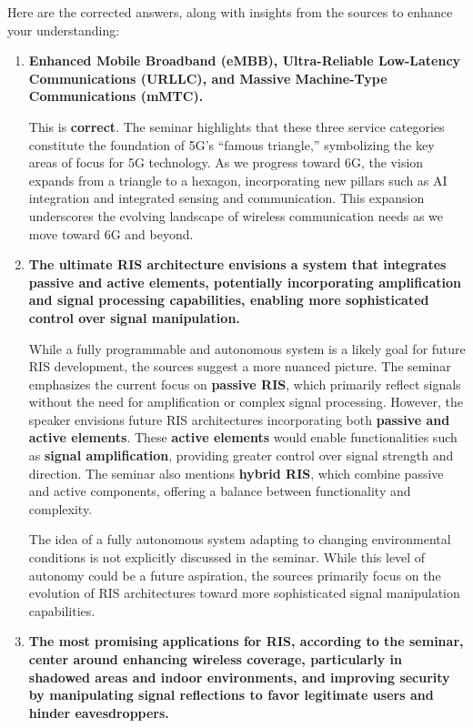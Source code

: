 \documentclass[
]{article}
\author{}
\date{}
\begin{document}
Here are the corrected answers, along with insights from the sources to
enhance your understanding:

\begin{enumerate}
\def\labelenumi{\arabic{enumi}.}
\item
  \textbf{Enhanced Mobile Broadband (eMBB), Ultra-Reliable Low-Latency
  Communications (URLLC), and Massive Machine-Type Communications
  (mMTC).}

  This is \textbf{correct}. The seminar highlights that these three
  service categories constitute the foundation of 5G's ``famous
  triangle,'' symbolizing the key areas of focus for 5G technology. As
  we progress toward 6G, the vision expands from a triangle to a
  hexagon, incorporating new pillars such as AI integration and
  integrated sensing and communication. This expansion underscores the
  evolving landscape of wireless communication needs as we move toward
  6G and beyond.
\item
  \textbf{The ultimate RIS architecture envisions a system that
  integrates passive and active elements, potentially incorporating
  amplification and signal processing capabilities, enabling more
  sophisticated control over signal manipulation.}

  While a fully programmable and autonomous system is a likely goal for
  future RIS development, the sources suggest a more nuanced picture.
  The seminar emphasizes the current focus on \textbf{passive RIS},
  which primarily reflect signals without the need for amplification or
  complex signal processing. However, the speaker envisions future RIS
  architectures incorporating both \textbf{passive and active elements}.
  These \textbf{active elements} would enable functionalities such as
  \textbf{signal amplification}, providing greater control over signal
  strength and direction. The seminar also mentions \textbf{hybrid RIS},
  which combine passive and active components, offering a balance
  between functionality and complexity.

  The idea of a fully autonomous system adapting to changing
  environmental conditions is not explicitly discussed in the seminar.
  While this level of autonomy could be a future aspiration, the sources
  primarily focus on the evolution of RIS architectures toward more
  sophisticated signal manipulation capabilities.
\item
  \textbf{The most promising applications for RIS, according to the
  seminar, center around enhancing wireless coverage, particularly in
  shadowed areas and indoor environments, and improving security by
  manipulating signal reflections to favor legitimate users and hinder
  eavesdroppers.}


\end{enumerate}
\end{document}
